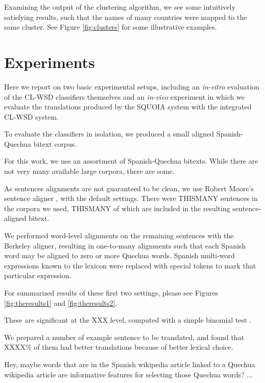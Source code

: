 \documentclass[10pt, a4paper]{article}
\begin{document}
Examining the output of the clustering algorithm, we see some intuitively
satisfying results, such that the names of many countries were mapped to the
same cluster. See Figure \ref{fig:clusters} for some illustrative
examples.

\section{Experiments}
Here we report on two basic experimental setups, including an \emph{in-vitro}
evaluation of the CL-WSD classifiers themselves and an \emph{in-vivo}
experiment in which we evaluate the translations produced by the SQUOIA system
with the integrated CL-WSD system.

To evaluate the classifiers in isolation, we produced a small aligned 
Spanish-Quechua bitext corpus. 

For this work, we use an assortment of Spanish-Quechua bitexts.
While there are not very many available large corpora, there are some.

As sentences alignments are not guaranteed to be clean, we use Robert Moore's
sentence aligner \cite{DBLP:conf/amta/Moore02}, with the default settings.
There were THISMANY sentences in the corpora we used, THISMANY of which are
included in the resulting sentence-aligned bitext.

We performed word-level alignments on the remaining sentences with the Berkeley
aligner, resulting in one-to-many alignments such that each Spanish word may be
aligned to zero or more Quechua words. Spanish multi-word expressions known to
the lexicon were replaced with special tokens to mark that particular
expression.



For summarized results of these first two settings, please see Figures
\ref{fig:theresults1} and \ref{fig:theresults2}.

These are significant at the XXX level, computed with a simple binomial test
\cite{salzberg1997comparing}.

We prepared a number of example sentence to be translated, and found that
XXXX\% of them had better translations because of better lexical choice.

Hey, maybe words that are in the Spanish wikipedia article linked to a Quechua
wikipedia article are informative features for selecting those Quechua words?
...
\end{document}
